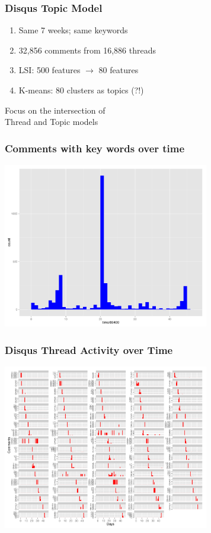 \documentclass{beamer}
\begin{document}
\begin{frame}\frametitle{Disqus Topic Model}
\begin{center}
{\Large 
\begin{enumerate}
\item Same 7 weeks; same keywords
\item 32,856 comments from 16,886 threads
\item LSI: 500 features $\rightarrow$ 80 features
\item K-means: 80 clusters as topics (?!)
\end{enumerate}
}
\end{center}
\end{frame}

\begin{frame}
\begin{center}
{\Huge Focus on the intersection of \\[15 pt] Thread and Topic models}
\end{center}
\end{frame}

\begin{frame}\frametitle{Comments with key words over time}
  \begin{center}
    \includegraphics[width=9cm]{./imgs/time.pdf}
  \end{center}
\end{frame}

\begin{frame}\frametitle{Disqus Thread Activity over Time}
  \begin{center}
    \includegraphics[width=9cm]{./imgs/timebythread.pdf}
  \end{center}
\end{frame}
\end{document}
